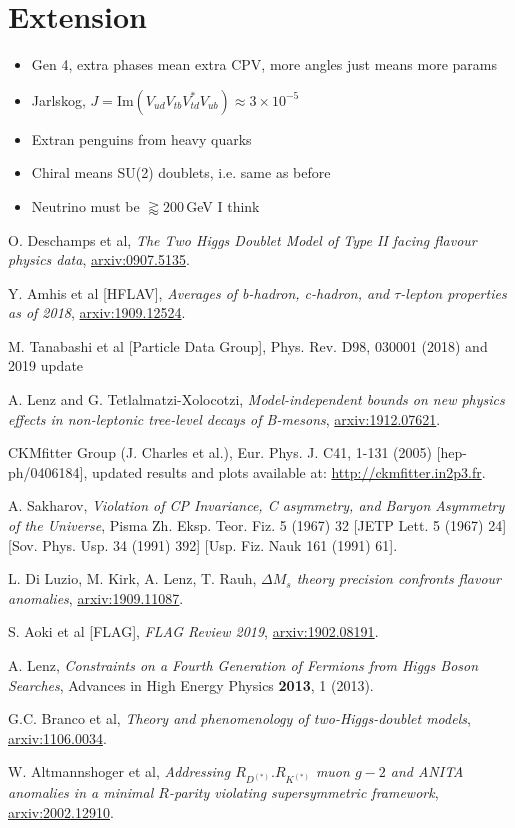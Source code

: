 \documentclass[12pt,a5paper]{article}
\renewcommand{\emph}{\textit}
\begin{document}
\section{Extension}
\begin{itemize}
    \item Gen 4, extra phases mean extra CPV, more angles just means more params
    \item Jarlskog, $J=\text{Im}(V_{ud}V_{tb}V_{td}^*V_{ub})\approx3\times10^{-5}$
    \item Extran penguins from heavy quarks
    \item Chiral means SU(2) doublets, i.e. same as before
    \item Neutrino must be $\gtrapprox200\,$GeV I think
\end{itemize}

\newpage
\begin{thebibliography}{99}
O. Deschamps et al, \emph{The Two Higgs Doublet Model of Type II facing flavour physics data}, \href{https://arxiv.org/pdf/0907.5135.pdf}{arxiv:0907.5135}.

Y. Amhis et al [HFLAV], \emph{Averages of b-hadron, c-hadron, and $\tau$-lepton properties as of 2018}, \href{https://arxiv.org/pdf/1909.12524.pdf}{arxiv:1909.12524}.

M. Tanabashi et al [Particle Data Group], Phys. Rev. D98, 030001 (2018) and 2019 update

A. Lenz and G. Tetlalmatzi-Xolocotzi, \emph{Model-independent bounds on new physics effects in non-leptonic tree-level decays of B-mesons}, \href{https://arxiv.org/pdf/1912.07621.pdf}{arxiv:1912.07621}.

CKMfitter Group (J. Charles et al.), Eur. Phys. J. C41, 1-131 (2005) [hep-ph/0406184], updated results and plots available at: \href{http://ckmfitter.in2p3.fr}{http://ckmfitter.in2p3.fr}.

A. Sakharov, \emph{Violation of CP Invariance, C asymmetry, and Baryon Asymmetry of the Universe}, Pisma Zh. Eksp. Teor. Fiz. 5 (1967) 32 [JETP Lett. 5 (1967) 24] [Sov. Phys. Usp. 34 (1991) 392] [Usp. Fiz. Nauk 161 (1991) 61].

L. Di Luzio, M. Kirk, A. Lenz, T. Rauh, \emph{$\Delta M_s$ theory precision confronts flavour anomalies}, \href{https://arxiv.org/pdf/1909.11087.pdf}{arxiv:1909.11087}.

S. Aoki et al [FLAG], \emph{FLAG Review 2019}, \href{https://arxiv.org/pdf/1902.08191.pdf}{arxiv:1902.08191}.

A. Lenz, \emph{Constraints on a Fourth Generation of Fermions from Higgs Boson Searches}, Advances in High Energy Physics \textbf{2013}, 1 (2013).

G.C. Branco et al, \emph{Theory and phenomenology of two-Higgs-doublet models}, \href{https://arxiv.org/pdf/1106.0034.pdf}{arxiv:1106.0034}.

W. Altmannshoger et al, \emph{Addressing $R_{D^{(*)}}. R_{K^{(*)}}$ muon $g-2$ and ANITA anomalies in a minimal $R$-parity violating supersymmetric framework}, \href{https://arxiv.org/pdf/2002.12910.pdf}{arxiv:2002.12910}.
\end{thebibliography}
\end{document}
